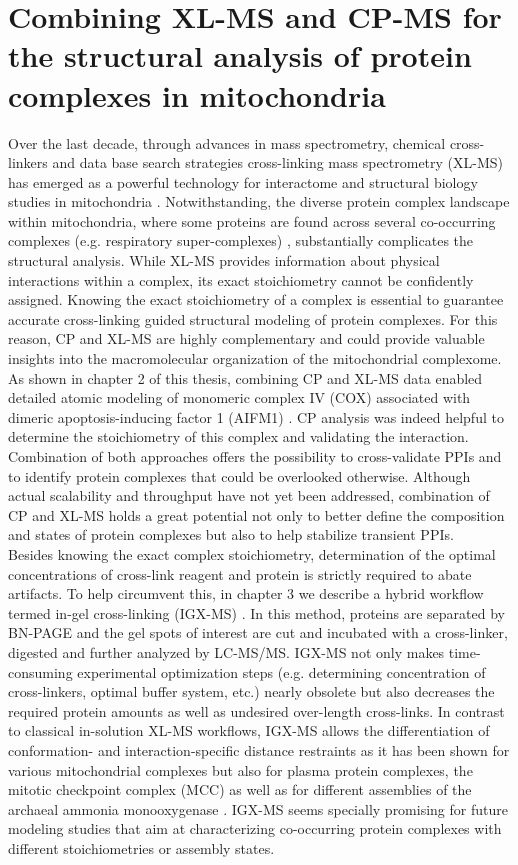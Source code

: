 \section{Combining XL-MS and CP-MS for the structural analysis of protein complexes in mitochondria}
Over the last decade, through advances in mass spectrometry, chemical cross-linkers and data base search strategies cross-linking mass spectrometry (XL-MS) has emerged as a powerful technology for interactome and structural biology studies in mitochondria \cite{Hevler_2021b, Liu_2018, Ryl_2020, Schweppe_2017}. Notwithstanding, the diverse protein complex landscape within mitochondria, where some proteins are found across several co-occurring complexes (e.g. respiratory super-complexes) \cite{Letts_2016, Rugolo_2021, Schägger_2000, Wu_2016}, substantially complicates the structural analysis. While XL-MS provides information about physical interactions within a complex, its exact stoichiometry cannot be confidently assigned. Knowing the exact stoichiometry of a complex is essential to guarantee accurate cross-linking guided structural modeling of protein complexes. For this reason, CP and XL-MS are highly complementary and could provide valuable insights into the macromolecular organization of the mitochondrial complexome. As shown in chapter 2 of this thesis, combining CP and XL-MS data enabled detailed atomic modeling of monomeric complex IV (COX) associated with dimeric apoptosis-inducing factor 1 (AIFM1) \cite{Hevler_2021b}. CP analysis was indeed helpful to determine the stoichiometry of this complex and validating the interaction. Combination of both approaches offers the possibility to cross-validate PPIs and to identify protein complexes that could be overlooked otherwise. Although actual scalability and throughput have not yet been addressed, combination of CP and XL-MS holds a great potential not only to better define the composition and states of protein complexes but also to help stabilize transient PPIs.\\
Besides knowing the exact complex stoichiometry, determination of the optimal concentrations of cross-link reagent and protein is strictly required to abate artifacts. To help circumvent this, in chapter 3 we describe a hybrid workflow termed in-gel cross-linking (IGX-MS) \cite{Hevler_2021a}. In this method, proteins are separated by BN-PAGE and the gel spots of interest are cut and incubated with a cross-linker, digested and further analyzed by LC-MS/MS. IGX-MS not only makes time-consuming experimental optimization steps (e.g. determining concentration of cross-linkers, optimal buffer system, etc.) nearly obsolete but also decreases the required protein amounts as well as undesired over-length cross-links. In contrast to classical in-solution XL-MS workflows, IGX-MS allows the differentiation of conformation- and interaction-specific distance restraints as it has been shown for various mitochondrial complexes but also for plasma protein complexes, the mitotic checkpoint complex (MCC) as well as for different assemblies of the archaeal ammonia monooxygenase \cite{Fischer_2022, Hevler_2021a, Hodgskiss_2022, Lukassen_2021}. IGX-MS seems specially promising for future modeling studies that aim at characterizing co-occurring protein complexes with different stoichiometries or assembly states.
